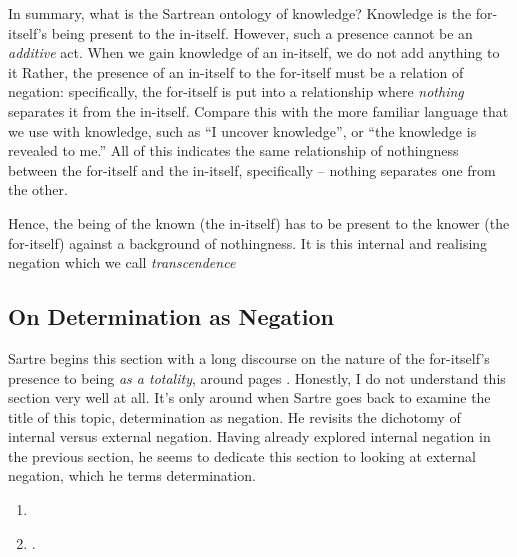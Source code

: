 In summary, what is the Sartrean ontology of knowledge? Knowledge is the for-itself's being present to the in-itself. However, such a presence cannot be an \emph{additive} act. When we gain knowledge of an in-itself, we do not add anything to it Rather, the presence of an in-itself to the for-itself must be a relation of negation: specifically, the for-itself is put into a relationship where \emph{nothing} separates it from the in-itself. Compare this with the more familiar language that we use with knowledge, such as \enquote{I uncover knowledge}, or \enquote{the knowledge is revealed to me.} All of this indicates the same relationship of nothingness between the for-itself and the in-itself, specifically -- nothing separates one from the other.

Hence, the being of the known (the in-itself) has to be present to the knower (the for-itself) against a background of nothingness. It is this internal and realising negation which we call \emph{transcendence}

\subsection{On Determination as Negation}

Sartre begins this section with a long discourse on the nature of the for-itself's presence to being \emph{as a totality}, around pages \autocite[256]{sartre}.
Honestly, I do not understand this section very well at all. It's only around \autocite[262]{sartre} when Sartre goes back to examine the title of this topic, determination as negation. He revisits the dichotomy of internal versus external negation. Having already explored internal negation in the previous section, he seems to dedicate this section to looking at external negation, which he terms determination.

\begin{enumerate}
  \item {}
  \item {}.
\end{enumerate}

